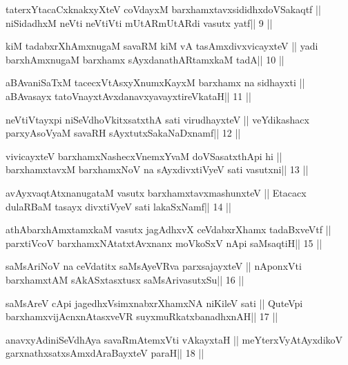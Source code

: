 \begin{shl}
taterxYtacaCxknakxyXteV coVdayxM barxhamxtavxsididhxdoVSakaqtf ||
niSidadhxM neVti neVtiVti mUtARmUtARdi vasutx yatf\hfill || 9 ||
\end{shl}

\begin{shl}
kiM tadabxrXhAmxnugaM savaRM kiM vA tasAmxdivxvicayxteV ||
yadi barxhAmxnugaM barxhamx sAyxdanathARtamxkaM tadA\hfill || 10 ||
\end{shl}

\begin{shl}
aBAvaniSaTxM tacecxVtAsxyXnumxKayxM barxhamx na sidhayxti ||
aBAvasayx tatoV\s nayxtAvxdanavxyavayxtireVkataH\hfill || 11 ||
\end{shl}

\begin{shl}
neVtiVtayxpi niSeVdhoVkitxsatxthA sati virudhayxteV ||
veYdikashacx parxyAsoV\s yaM savaRH sAyxtutxSakaNaDxnamf\hfill || 12 ||
\end{shl}

\begin{shl}
vivicayxteV barxhamxNashecxVnemxYvaM doVSasatxthA\s pi hi ||
barxhamxtavxM barxhamxNoV na sAyxdivxtiVyeV sati vasutxni\hfill || 13 ||
\end{shl}

\begin{shl}
avAyxvaqtAtxnanugataM vasutx barxhamxtavxmashunxteV ||
Etacacx dulaRBaM tasayx divxtiVyeV sati lakaSxNamf\hfill || 14 ||
\end{shl}

\begin{shl}
athAbarxhAmxtamxkaM vasutx jagAdhxvX ceVdabxrXhamx tadaBxveVtf ||
parxtiVcoV barxhamxNA\s tatxtAvxnanx moVkoSxV nApi saMsaqtiH\hfill || 15 ||
\end{shl}

\begin{shl}
saMsAriNoV na ceVdatitx saMsAyeVRva parxsajayxteV ||
nA\s\s ponxVti barxhamxtAM sAkASxtasxtusx saMsArivasutxSu\hfill || 16 ||
\end{shl}

\begin{shl}
saMsAreV cApi jagedhxV\s simxnabxrXhamxNA niKileV sati ||
QuteV\s pi barxhamxvijAcnxnAtasxveVR suyxmuRkatxbanadhxnAH\hfill || 17 ||
\end{shl}

\begin{shl}
anavxyAdiniSeVdhAya savaRmAtemxVti vAkayxtaH ||
meYterxVyAtAyxdikoV garxnathxsatxsAmxdAraBayxteV paraH\hfill || 18 ||
\end{shl}

